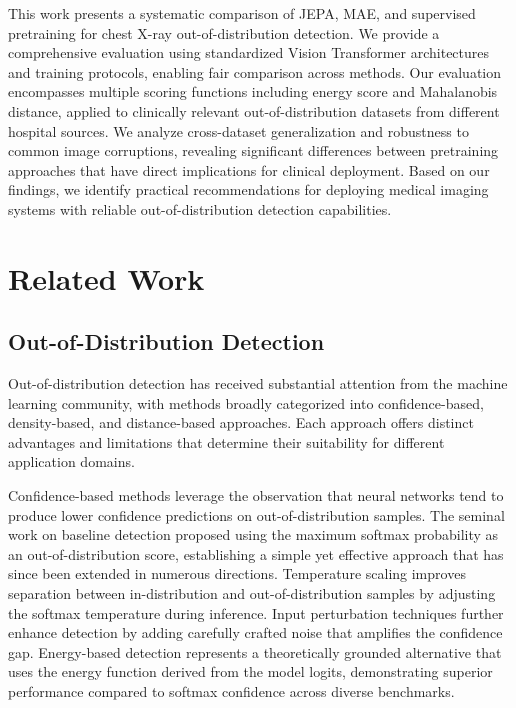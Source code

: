 \documentclass[11pt,a4paper]{article}
\begin{document}
This work presents a systematic comparison of JEPA, MAE, and supervised pretraining for chest X-ray out-of-distribution detection. We provide a comprehensive evaluation using standardized Vision Transformer architectures and training protocols, enabling fair comparison across methods. Our evaluation encompasses multiple scoring functions including energy score and Mahalanobis distance, applied to clinically relevant out-of-distribution datasets from different hospital sources. We analyze cross-dataset generalization and robustness to common image corruptions, revealing significant differences between pretraining approaches that have direct implications for clinical deployment. Based on our findings, we identify practical recommendations for deploying medical imaging systems with reliable out-of-distribution detection capabilities.

\section{Related Work}

\subsection{Out-of-Distribution Detection}

Out-of-distribution detection has received substantial attention from the machine learning community, with methods broadly categorized into confidence-based, density-based, and distance-based approaches. Each approach offers distinct advantages and limitations that determine their suitability for different application domains.

Confidence-based methods leverage the observation that neural networks tend to produce lower confidence predictions on out-of-distribution samples. The seminal work on baseline detection proposed using the maximum softmax probability as an out-of-distribution score, establishing a simple yet effective approach that has since been extended in numerous directions. Temperature scaling improves separation between in-distribution and out-of-distribution samples by adjusting the softmax temperature during inference. Input perturbation techniques further enhance detection by adding carefully crafted noise that amplifies the confidence gap. Energy-based detection represents a theoretically grounded alternative that uses the energy function derived from the model logits, demonstrating superior performance compared to softmax confidence across diverse benchmarks.
\end{document}
